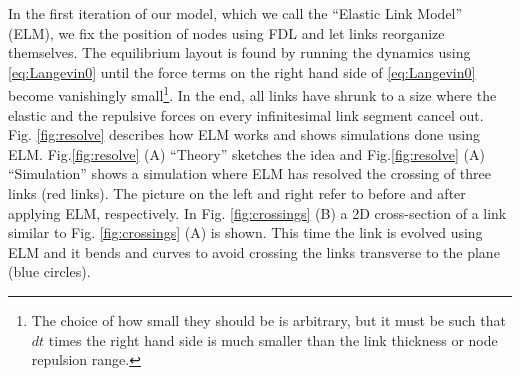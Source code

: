 \documentclass[nofootinbib,preprint,floatfix]{revtex4} %
\begin{document}

In the first iteration of our model, which we call the ``Elastic Link Model'' (ELM), we fix the position of nodes using FDL and let links reorganize themselves. 
The equilibrium layout is found by %
running the dynamics using  \eqref{eq:Langevin0} until the force terms on the right hand side of \eqref{eq:Langevin0} become vanishingly small\footnote{The choice of how small they should be is arbitrary, but it must be such that $dt$ times the right hand side is much smaller than the link thickness or node repulsion range.}. 
In the end, all links have shrunk to a size where the elastic and the repulsive forces on every infinitesimal link segment cancel out. 
Fig. \ref{fig:resolve} describes how ELM works and shows  simulations done using ELM. 
Fig.\ref{fig:resolve} (A) ``Theory'' sketches the idea and Fig.\ref{fig:resolve} (A) ``Simulation'' shows a simulation where ELM has resolved the crossing of three links (red links). 
The picture on the left and right refer to before and after applying ELM, respectively. In Fig. \ref{fig:crossings} (B) a 2D cross-section of a link similar to  Fig. \ref{fig:crossings} (A) is shown.
This time the link is evolved using ELM and it bends and curves to avoid crossing the links transverse to the plane (blue circles). 
%
\end{document}
